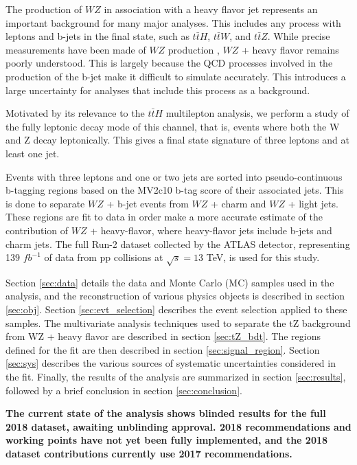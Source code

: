 
The production of $WZ$ in association with a heavy flavor jet represents an important background for many major analyses. This includes any process with leptons and b-jets in the final state, such as $t\bar{t}H$, $t\bar{t}W$, and $t\bar{t}Z$. While precise measurements have been made of $WZ$ production \cite{WZ_36}, $WZ$ + heavy flavor remains poorly understood. This is largely because the QCD processes involved in the production of the b-jet make it difficult to simulate accurately. This introduces a large uncertainty for analyses that include this process as a background.  

Motivated by its relevance to the $t\bar{t}H$ multilepton analysis, we perform a study of the fully leptonic decay mode of this channel, that is, events where both the W and Z decay leptonically. This gives a final state signature of three leptons and at least one jet.

Events with three leptons and one or two jets are sorted into pseudo-continuous b-tagging regions based on the MV2c10 b-tag score of their associated jets. This is done to separate $WZ$ + b-jet events from $WZ$ + charm and $WZ$ + light jets. These regions are fit to data in order make a more accurate estimate of the contribution of $WZ$ + heavy-flavor, where heavy-flavor jets include b-jets and charm jets. The full Run-2 dataset collected by the ATLAS detector, representing 139 $fb^{-1}$ of data from pp collisions at $\sqrt{s} = 13$ TeV, is used for this study.

Section \ref{sec:data} details the data and Monte Carlo (MC) samples used in the analysis, and the reconstruction of various physics objects is described in section \ref{sec:obj}. Section \ref{sec:evt_selection} describes the event selection applied to these samples. The multivariate analysis techniques used to separate the tZ background from WZ + heavy flavor are described in section \ref{sec:tZ_bdt}. The regions defined for the fit are then described in section \ref{sec:signal_region}. Section \ref{sec:sys} describes the various sources of systematic uncertainties considered in the fit. Finally, the results of the analysis are summarized in section \ref{sec:results}, followed by a brief conclusion in section \ref{sec:conclusion}.

\textbf{The current state of the analysis shows blinded results for the full 2018 dataset, awaiting unblinding approval. 2018 recommendations and working points have not yet been fully implemented, and the 2018 dataset contributions currently use 2017 recommendations.}
